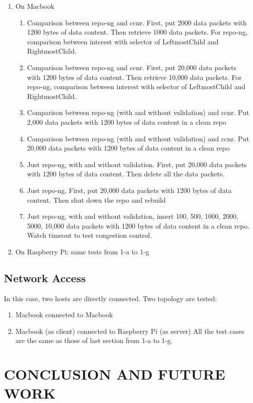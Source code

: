 \documentclass{acm_proc_article-sp}
\begin{document}
\begin{enumerate}
\item On Macbook
\begin{enumerate}
\item Comparison between repo-ng and ccnr. First, put 2000 data packets with 1200 bytes of data content. Then retrieve 1000 data packets. For repo-ng, comparison between interest with selector of LeftmostChild and RightmostChild.
\item Comparison between repo-ng and ccnr. First, put 20,000 data packets with 1200 bytes of data content. Then retrieve 10,000 data packets. For repo-ng, comparison between interest with selector of LeftmostChild and RightmostChild.
\item Comparison between repo-ng (with and without validation) and ccnr. Put 2,000 data packets with 1200 bytes of data content in a clean repo
\item Comparison between repo-ng (with and without validation) and ccnr. Put 20,000 data packets with 1200 bytes of data content in a clean repo
\item Just repo-ng, with and without validation. First, put 20,000 data packets with 1200 bytes of data content. Then delete all the data packets.
\item Just repo-ng. First, put 20,000 data packets with 1200 bytes of data content. Then shut down the repo and rebuild
\item Just repo-ng, with and without validation, insert 100, 500, 1000, 2000, 5000, 10,000 data packets with 1200 bytes of data content in a clean repo. Watch timeout to test congestion control.
\end{enumerate}
\item On Raspberry Pi: same tests from 1-a to 1-g
\end{enumerate}

\subsection{Network Access}
In this case, two hosts are directly connected. Two topology are tested:
\begin{enumerate}
\item Macbook connected to Macbook
\item Macbook (as client) connected to Raspberry Pi (as server)
All the test cases are the same as those of last section from 1-a to 1-g.
\end{enumerate}


\section{CONCLUSION AND FUTURE WORK}



\end{document}
